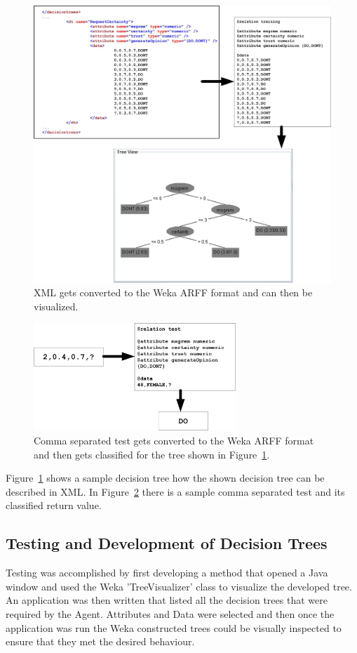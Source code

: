 \begin{figure}[h!]
  \centering  
  \includegraphics[width=5in]{images/xml2dtxtra.jpg}
  \caption{XML gets converted to the Weka ARFF format and can then be visualized.}
  \label{fig:xml2dt}
\end{figure}

\begin{figure}[h!]
  \centering  
  \includegraphics[width=3in]{images/xml2dttest.jpg}
  \caption{Comma separated test gets converted to the Weka ARFF format and then gets classified for 
  the tree shown in Figure~\ref{fig:xml2dt}.}
  \label{fig:xml2dttest}
\end{figure}

Figure~\ref{fig:xml2dt} shows a sample decision tree how the shown decision tree can be described in XML.  
In Figure~\ref{fig:xml2dttest} there is a sample comma separated test and its classified return value.

\subsection{Testing and Development of Decision Trees}
Testing was accomplished by first developing a method that opened a Java window and used the Weka
'TreeVisualizer' class to visualize the developed tree.  An application was then written that listed
all the decision trees that were required by the Agent.  Attributes and Data were selected and then 
once the application was run the Weka constructed trees could be visually inspected to ensure that
they met the desired behaviour.

